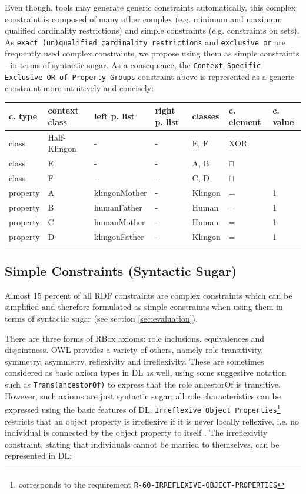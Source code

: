 \documentclass{llncs}
\newcommand{\ms}[1]{\texttt{#1}}
\newenvironment{gcotable}{
  \scriptsize
  \sffamily
  \vspace{0cm}
	\begin{center}
  \begin{tabular}{l|l|l|l|l|l|l}
  \hline
  \textbf{c. type} & \textbf{context class} & \textbf{left p. list} & \textbf{right p. list} & \textbf{classes} & \textbf{c. element} & \textbf{c. value} \\
  \hline

}{
  \hline
  \end{tabular}
	\end{center}
}
\begin{document}
Even though, tools may generate generic constraints automatically, this complex constraint is composed of many other complex (e.g. minimum and maximum qualified cardinality restrictions) and simple constraints (e.g. constraints on sets).
As \ms{exact (un)qualified cardinality restrictions} and \ms{exclusive or} are frequently used complex constraints,
we propose using them as simple constraints - 	in terms of syntactic sugar.
As a consequence, the \ms{Context-Specific Exclusive OR of Property Groups} constraint above is represented as a generic constraint more intuitively and concisely:

\begin{gcotable}
class & Half-Klingon & - & - & E, F & XOR \\
class & E & - & - & A, B & $\sqcap$ \\
class & F & - & - & C, D & $\sqcap$ \\
property & A & klingonMother & - & Klingon & = & 1 \\
property & B & humanFather & - & Human & = & 1 \\
property & C & humanMother & - & Human & = & 1 \\
property & D & klingonFather & - & Klingon & = & 1 \\
\end{gcotable}

\subsection{Simple Constraints (Syntactic Sugar)}

Almost 15 percent of all RDF constraints are complex constraints which can be simplified and therefore formulated as simple constraints when using them in terms of syntactic sugar (see section \ref{sec:evaluation}).

There are three forms of RBox axioms: role inclusions, equivalences and disjointness. 
OWL provides a variety of others, namely role transitivity, symmetry, asymmetry, reflexivity and irreflexivity. 
These are sometimes considered as basic axiom types in DL as well, using some suggestive notation such as
\ms{Trans(ancestorOf)} to express that the role ancestorOf is transitive. 
However, such axioms are just syntactic sugar; 
all role characteristics can be expressed using the basic features of DL.
\ms{Irreflexive Object Properties}\footnote{corresponds to the requirement \ms{R-60-IRREFLEXIVE-OBJECT-PROPERTIES}}
restricts that an object property is irreflexive if it is never locally reflexive, i.e. no individual is connected by the object property to itself \cite{Kroetzsch2012}.
The irreflexivity constraint, stating that individuals cannot be married to themselves, can be represented in DL:
\end{document}
